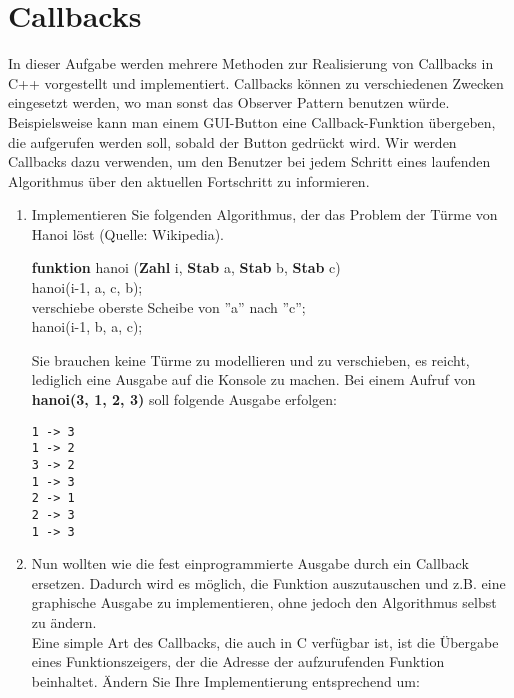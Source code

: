 \documentclass[
  accentcolor=tud1c,	%
  colorbacktitle,		%
  inverttitle,			%
  german,				%
  twoside
]{tudexercise}
\begin{document}
\section{Callbacks}
In dieser Aufgabe werden mehrere Methoden zur Realisierung von  Callbacks in C++ vorgestellt und implementiert. Callbacks können zu verschiedenen Zwecken eingesetzt werden, wo man sonst das Observer Pattern benutzen würde. Beispielsweise kann man einem GUI-Button eine Callback-Funktion übergeben, die aufgerufen werden soll, sobald der Button gedrückt wird. Wir werden Callbacks dazu verwenden, um den Benutzer bei jedem Schritt eines laufenden Algorithmus über den aktuellen Fortschritt zu informieren.

\begin{enumerate}

\item Implementieren Sie folgenden Algorithmus, der das Problem der Türme von Hanoi löst (Quelle: Wikipedia). \\
\begin{algorithm}[H]
 \SetAlgoLined
 \textbf{funktion} hanoi (\textbf{Zahl} i, \textbf{Stab} a, \textbf{Stab} b, \textbf{Stab} c) { \\
      {
        hanoi(i-1, a, c, b);\\
        verschiebe oberste Scheibe von ''a'' nach ''c''; \\
        hanoi(i-1, b, a, c); \\
     }
 }
\end{algorithm}

Sie brauchen keine Türme zu modellieren und zu verschieben, es reicht, lediglich eine Ausgabe auf die Konsole zu machen. Bei einem Aufruf von \textbf{hanoi(3, 1, 2, 3)} soll folgende Ausgabe erfolgen:
\begin{lstlisting}
1 -> 3
1 -> 2
3 -> 2
1 -> 3
2 -> 1
2 -> 3
1 -> 3
\end{lstlisting}

\item
Nun wollten wie die fest einprogrammierte Ausgabe durch ein Callback ersetzen. Dadurch wird es möglich, die Funktion auszutauschen und z.B. eine graphische Ausgabe zu implementieren, ohne jedoch den Algorithmus selbst zu ändern. \\

Eine simple Art des Callbacks, die auch in C verfügbar ist, ist die Übergabe eines Funktionszeigers, der die Adresse der aufzurufenden Funktion beinhaltet. Ändern Sie Ihre Implementierung entsprechend um:


\end{enumerate}
\end{document}
